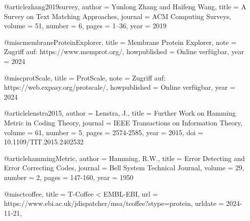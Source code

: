 \documentclass[german,version-2022-01]{uzl-thesis}
\begin{document}
\begin{bibtex-entries}
@article{zhang2019survey,
  author  = {Yunlong Zhang and Haifeng Wang},
  title   = {A Survey on Text Matching Approaches},
  journal = {ACM Computing Surveys},
  volume  = {51},
  number  = {6},
  pages    = {1--36},
  year     = {2019}
}

@misc{membraneProteinExplorer,
  title = {Membrane Protein Explorer},
  note = {Zugriff auf: https://www.memprot.org/},
  howpublished = {Online verf\"ugbar},
  year = {2024}
}

@misc{protScale,
  title = {ProtScale},
  note = {Zugriff auf: https://web.expasy.org/protscale/},
  howpublished = {Online verf\"ugbar},
  year = {2024}
}

@article{lenstra2015,
  author = {Lenstra, J.},
  title = {Further Work on Hamming Metric in Coding Theory},
  journal = {IEEE Transactions on Information Theory},
  volume = {61},
  number = {5},
  pages = {2574-2585},
  year = {2015},
  doi = {10.1109/TIT.2015.2402532}
}

@article{hammingMetric,
  author = {Hamming, R.W.},
  title = {Error Detecting and Error Correcting Codes},
  journal = {Bell System Technical Journal},
  volume = {29},
  number = {2},
  pages = {147-160},
  year = {1950}
}

@misc{tcoffee,
  title = {T-{Coffee} {\textless} {EMBL}-{EBI}},
  url = {https://www.ebi.ac.uk/jdispatcher/msa/tcoffee?stype=protein},
  urldate = {2024-11-21},
}

\end{bibtex-entries}



%
%
%
%
\end{document}
